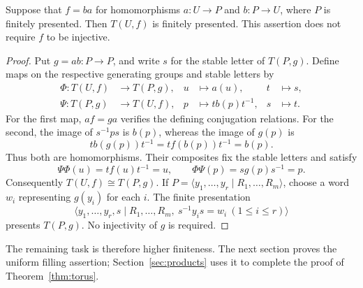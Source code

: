\begin{lemma}\label{lem:torus-presentation}
Suppose that $f=ba$ for homomorphisms $a:U\to P$ and $b:P\to U$,
where $P$ is finitely presented.  Then $T(U,f)$ is finitely presented.
This assertion does not require $f$ to be injective.
\end{lemma}

\begin{proof}
Put $g=ab:P\to P$, and write $s$ for the stable letter of $T(P,g)$.
Define maps on the respective generating groups and stable letters by
\[
 \begin{aligned}
 \Phi:T(U,f)&\longrightarrow T(P,g),
 &u&\longmapsto a(u),& t&\longmapsto s,\\
 \Psi:T(P,g)&\longrightarrow T(U,f),
 &p&\longmapsto t b(p)t^{-1},& s&\longmapsto t.
 \end{aligned}
\]
For the first map, $af=ga$ verifies the defining conjugation
relations.  For the second, the image of $s^{-1}ps$ is $b(p)$,
whereas the image of $g(p)$ is
\[
 t b(g(p))t^{-1}=t f(b(p))t^{-1}=b(p).
\]
Thus both are homomorphisms.  Their composites fix the stable letters
and satisfy
\[
 \Psi\Phi(u)=t f(u)t^{-1}=u,
 \qquad
 \Phi\Psi(p)=s g(p)s^{-1}=p.
\]
Consequently $T(U,f)\cong T(P,g)$.  If
$P=\langle y_1,\ldots,y_r\mid R_1,\ldots,R_m\rangle$, choose a word
$w_i$ representing $g(y_i)$ for each $i$.  The finite presentation
\[
 \langle y_1,\ldots,y_r,s\mid
 R_1,\ldots,R_m,\ s^{-1}y_i s=w_i\ (1\le i\le r)\rangle
\]
presents $T(P,g)$.  No injectivity of $g$ is required.
\end{proof}

The remaining task is therefore higher finiteness.  The next section
proves the uniform filling assertion; Section~\ref{sec:products}
uses it to complete the proof of Theorem~\ref{thm:torus}.
